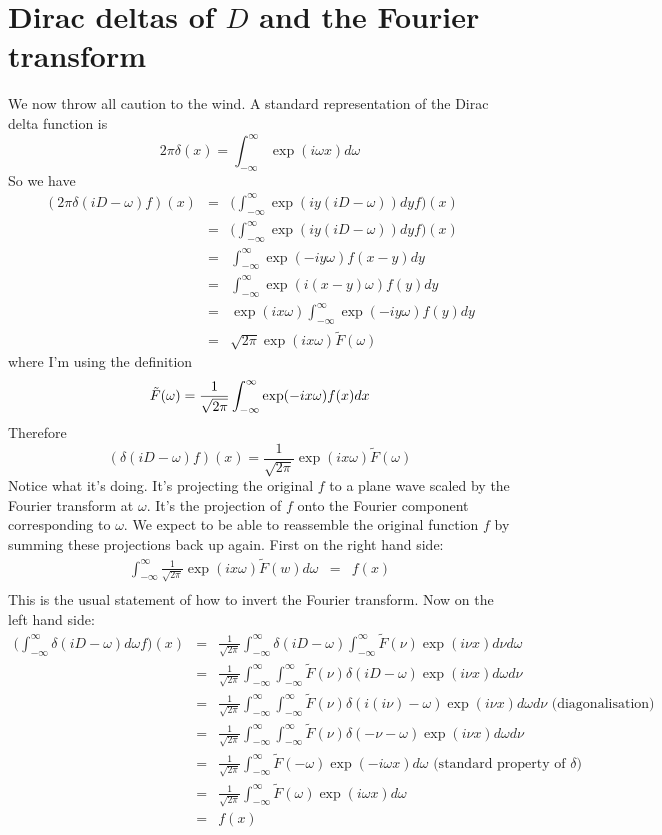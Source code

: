 \documentclass[a4paper]{article}
\theoremstyle{definition}
\begin{document}
\section{Dirac deltas of $D$ and the Fourier transform}
We now throw all caution to the wind.
A standard representation of the Dirac delta function is
\[
2\pi\delta(x) = \int_{-\infty}^\infty \exp(i\omega x)d\omega
\]
So we have
\begin{eqnarray*}
(2\pi\delta(iD-\omega)f)(x) & = & \Big(\int_{-\infty}^\infty\exp(iy(iD-\omega))dyf\Big)(x) \\
& = & \Big(\int_{-\infty}^\infty\exp(iy(iD-\omega))dyf\Big)(x) \\
& = & \int_{-\infty}^\infty\exp(-iy\omega)f(x-y)dy \\
& = & \int_{-\infty}^\infty\exp(i(x-y)\omega)f(y)dy \\
& = & \exp(ix\omega)\int_{-\infty}^\infty\exp(-iy\omega)f(y)dy \\
& = & \sqrt{2\pi}\exp(ix\omega)\tilde{F}(\omega)
\end{eqnarray*}
where I'm using the definition
\[
\tilde{F}(\omega) = \frac{1}{\sqrt{2\pi}}\int_{-\infty}^\infty\exp(-ix\omega)f(x)dx \\
\]
Therefore
\[
(\delta(iD-\omega)f)(x) = \frac{1}{\sqrt{2\pi}}\exp(ix\omega)\tilde{F}(\omega)
\]
Notice what it's doing.
It's projecting the original $f$ to a plane wave scaled by the Fourier transform at $\omega$.
It's the projection of $f$ onto the Fourier component corresponding to $\omega$.
We expect to be able to reassemble the original function $f$ by summing these projections back up again.
First on the right hand side:
\begin{eqnarray*}
\int_{-\infty}^\infty\frac{1}{\sqrt{2\pi}}\exp(ix\omega)\tilde{F}(w)d\omega & = & f(x) \\
\end{eqnarray*}
This is the usual statement of how to invert the Fourier transform.
Now on the left hand side:
\begin{eqnarray*}
\Big(\int_{-\infty}^\infty\delta(iD-\omega)d\omega f\Big)(x) & = &
\frac{1}{\sqrt{2\pi}}\int_{-\infty}^\infty\delta(iD-\omega)\int_{-\infty}^\infty\tilde{F}(\nu)\exp(i\nu x)d\nu d\omega \\
& = & \frac{1}{\sqrt{2\pi}}\int_{-\infty}^\infty\int_{-\infty}^\infty\tilde{F}(\nu)\delta(iD-\omega)\exp(i\nu x)d\omega d\nu \\
& = & \frac{1}{\sqrt{2\pi}}\int_{-\infty}^\infty\int_{-\infty}^\infty\tilde{F}(\nu)\delta(i(i\nu)-\omega)\exp(i\nu x)d\omega d\nu \mbox{ (diagonalisation)}\\
& = & \frac{1}{\sqrt{2\pi}}\int_{-\infty}^\infty\int_{-\infty}^\infty\tilde{F}(\nu)\delta(-\nu-\omega)\exp(i\nu x)d\omega d\nu \\
& = & \frac{1}{\sqrt{2\pi}}\int_{-\infty}^\infty\tilde{F}(-\omega)\exp(-i\omega x)d\omega \mbox{ (standard property of $\delta$)} \\
& = & \frac{1}{\sqrt{2\pi}}\int_{-\infty}^\infty\tilde{F}(\omega)\exp(i\omega x)d\omega \\
& = & f(x) \\
\end{eqnarray*}
\end{document}
